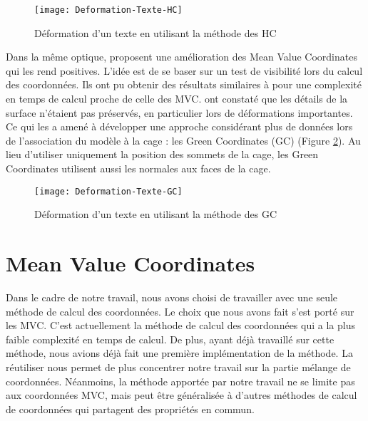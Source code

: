 \begin{figure}[ht]
\begin{center}
\texttt{[image: Deformation-Texte-HC]}

\caption[Déformation d'un texte (HC)] {Déformation d'un texte en utilisant la
méthode des HC}

\label{DEFHar}
\end{center}
\end{figure}

Dans la même optique, \cite{LKCL07} proposent une amélioration des Mean Value
Coordinates qui les rend positives. L'idée est de se baser sur un test de
visibilité lors du calcul des coordonnées. Ils ont pu obtenir des résultats
similaires à \cite{JMDGS07} pour une complexité en temps de calcul proche de
celle des MVC. \cite{LLC08} ont constaté que les détails de la surface
n'étaient pas préservés, en particulier lors de déformations importantes. Ce
qui les a amené à développer une approche considérant plus de données lors de
l'association du modèle à la cage : les Green Coordinates (GC) (Figure
\ref{DEFGre}). Au lieu d'utiliser uniquement la position des sommets de la
cage, les Green Coordinates utilisent aussi les normales aux faces de la cage.

\begin{figure}[ht]
\begin{center}
\texttt{[image: Deformation-Texte-GC]}

\caption[Déformation d'un texte (GC)] {Déformation d'un texte en utilisant la
méthode des GC}

\label{DEFGre}
\end{center}
\end{figure}

\section{Mean Value Coordinates}

Dans le cadre de notre travail, nous avons choisi de travailler avec une seule
méthode de calcul des coordonnées. Le choix que nous avons fait s'est porté
sur les MVC. C'est actuellement la méthode de calcul des coordonnées qui a la
plus faible complexité en temps de calcul. De plus, ayant déjà travaillé sur
cette méthode, nous avions déjà fait une première implémentation de la
méthode. La réutiliser nous permet de plus concentrer notre travail sur la
partie mélange de coordonnées. Néanmoins, la méthode apportée par notre
travail ne se limite pas aux coordonnées MVC, mais peut être généralisée à
d'autres méthodes de calcul de coordonnées qui partagent des propriétés en
commun.

